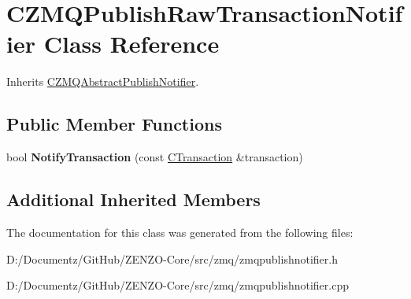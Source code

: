 \hypertarget{class_c_z_m_q_publish_raw_transaction_notifier}{}\section{C\+Z\+M\+Q\+Publish\+Raw\+Transaction\+Notifier Class Reference}
\label{class_c_z_m_q_publish_raw_transaction_notifier}


Inherits \mbox{\hyperlink{class_c_z_m_q_abstract_publish_notifier}{C\+Z\+M\+Q\+Abstract\+Publish\+Notifier}}.

\subsection*{Public Member Functions}
\begin{DoxyCompactItemize}
\item 
\mbox{\label{class_c_z_m_q_publish_raw_transaction_notifier_a434db5fe779bebb7da0efcb61c9a1f59}} 
bool {\bfseries Notify\+Transaction} (const \mbox{\hyperlink{class_c_transaction}{C\+Transaction}} \&transaction)
\end{DoxyCompactItemize}
\subsection*{Additional Inherited Members}


The documentation for this class was generated from the following files\+:\begin{DoxyCompactItemize}
\item 
D\+:/\+Documentz/\+Git\+Hub/\+Z\+E\+N\+Z\+O-\/\+Core/src/zmq/zmqpublishnotifier.\+h\item 
D\+:/\+Documentz/\+Git\+Hub/\+Z\+E\+N\+Z\+O-\/\+Core/src/zmq/zmqpublishnotifier.\+cpp\end{DoxyCompactItemize}
